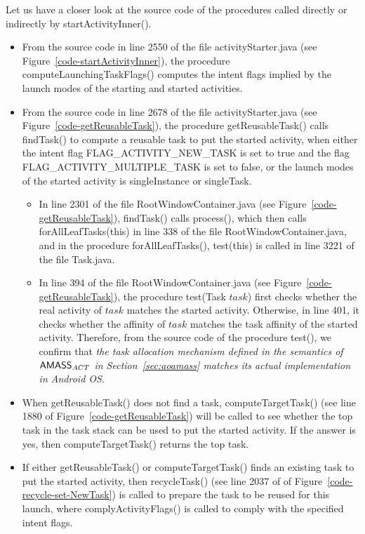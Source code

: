 Let us have a closer look at the source code of the procedures called directly or indirectly by startActivityInner(). 
\begin{itemize}
\item From the source code in line 2550 of the file activityStarter.java (see Figure~\ref{code-startActivityInner}), the procedure computeLaunchingTaskFlags() computes the intent flags implied by the launch modes of the starting and started activities. 
%
\item From the source code in line 2678 of the file activityStarter.java (see Figure~\ref{code-getReusableTask}), the procedure getReusableTask() calls findTask() to compute a reusable task to put the started activity, when either the intent flag FLAG\_ACTIVITY\_NEW\_TASK is set to true and the flag FLAG\_ACTIVITY\_MULTIPLE\_TASK is set to false, or the launch modes of the started activity is singleInstance or singleTask.
\begin{itemize}
\item In line 2301 of the file RootWindowContainer.java (see Figure~\ref{code-getReusableTask}), findTask() calls process(), which then calls forAllLeafTasks(this) in line 338 of the file  RootWindowContainer.java, and in the procedure forAllLeafTasks(), test(this) is called in line 3221 of the file Task.java. 
%
\item In line 394 of the file RootWindowContainer.java (see Figure~\ref{code-getReusableTask}), the procedure test(Task $task$) first checks whether the real activity of $task$ matches the started activity. Otherwise, in line 401, it checks whether the affinity of $task$ matches the task affinity of the started activity. Therefore, from the source code of the procedure test(), we confirm that \emph{the task allocation mechanism defined in the semantics of $\textsf{AMASS}_{ACT}$ in Section~\ref{sec:aoamass} matches its actual implementation in Android OS}. 
\end{itemize}
%
\item When getReusableTask() does not find a task, computeTargetTask() (see line 1880 of Figure~\ref{code-getReusableTask}) will be called to see whether the top task in the task stack can be used to put the started activity. If the answer is yes, then computeTargetTask() returns the top task. 
%
\item If either getReusableTask() or computeTargetTask() finds an existing task to put the started activity, then recycleTask() (see line 2037 of of Figure~\ref{code-recycle-set-NewTask}) is called to prepare the task to be reused for this launch, where complyActivityFlags() is called to comply with the specified intent flags. 
%


\end{itemize}
